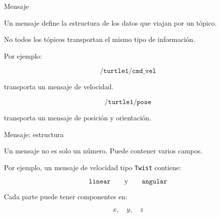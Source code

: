 \documentclass[aspectratio=169]{beamer}
\begin{document}
\begin{frame}{Mensaje}

    Un mensaje define la estructura de los datos que viajan por un tópico.

    No todos los tópicos transportan el mismo tipo de información.

    \vspace{0.3cm}

    Por ejemplo:

    \[
    \texttt{/turtle1/cmd\_vel}
    \]

    transporta un mensaje de velocidad.

    \[
    \texttt{/turtle1/pose}
    \]

    transporta un mensaje de posición y orientación.

    \vspace{0.3cm}


\end{frame}

\begin{frame}{Mensaje: estructura}

    Un mensaje no es solo un número. Puede contener varios campos.

    Por ejemplo, un mensaje de velocidad tipo \texttt{Twist} contiene:

    \[
    \texttt{linear}
    \qquad
    \text{y}
    \qquad
    \texttt{angular}
    \]

    \vspace{0.2cm}

    Cada parte puede tener componentes en:

    \[
    x,\quad y,\quad z
    \]

    \vspace{0.3cm}


\end{frame}
\end{document}
